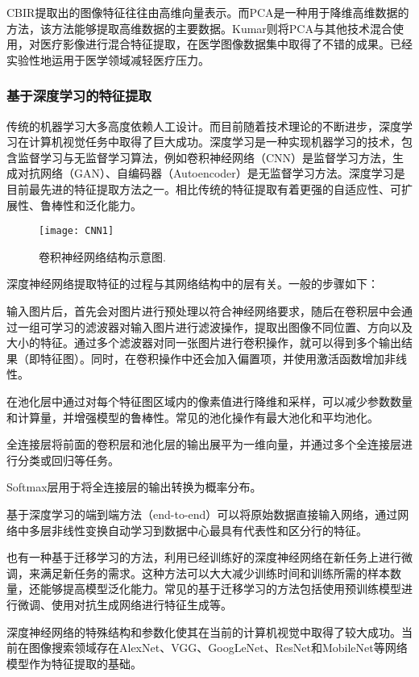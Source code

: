 \documentclass[bachelor_p]{hdu-thesis}
\begin{document}
CBIR提取出的图像特征往往由高维向量表示。而PCA是一种用于降维高维数据的方法，该方法能够提取高维数据的主要数据。Kumar\citep{KUMAR}则将PCA与其他技术混合使用，对医疗影像进行混合特征提取，在医学图像数据集中取得了不错的成果。已经实验性地运用于医学领域减轻医疗压力。

\subsubsection{基于深度学习的特征提取}

传统的机器学习大多高度依赖人工设计。而目前随着技术理论的不断进步，深度学习在计算机视觉任务中取得了巨大成功。深度学习是一种实现机器学习的技术，包含监督学习与无监督学习算法，例如卷积神经网络（CNN）是监督学习方法，生成对抗网络（GAN）、自编码器（Autoencoder）是无监督学习方法。深度学习是目前最先进的特征提取方法之一。相比传统的特征提取有着更强的自适应性、可扩展性、鲁棒性和泛化能力。

\begin{figure}[!htb]
  \centering
  \texttt{[image: CNN1]}
  \caption{卷积神经网络结构示意图.}
  \label{fig_CNN1}
\end{figure}


深度神经网络提取特征的过程与其网络结构中的层有关。一般的步骤如下：

输入图片后，首先会对图片进行预处理以符合神经网络要求，随后在卷积层中会通过一组可学习的滤波器对输入图片进行滤波操作，提取出图像不同位置、方向以及大小的特征。通过多个滤波器对同一张图片进行卷积操作，就可以得到多个输出结果（即特征图）。同时，在卷积操作中还会加入偏置项，并使用激活函数增加非线性。

在池化层中通过对每个特征图区域内的像素值进行降维和采样，可以减少参数数量和计算量，并增强模型的鲁棒性。常见的池化操作有最大池化和平均池化。

全连接层将前面的卷积层和池化层的输出展平为一维向量，并通过多个全连接层进行分类或回归等任务。

Softmax层用于将全连接层的输出转换为概率分布。

基于深度学习的端到端方法（end-to-end）可以将原始数据直接输入网络，通过网络中多层非线性变换自动学习到数据中心最具有代表性和区分行的特征。

也有一种基于迁移学习的方法，利用已经训练好的深度神经网络在新任务上进行微调，来满足新任务的需求。这种方法可以大大减少训练时间和训练所需的样本数量，还能够提高模型泛化能力。常见的基于迁移学习的方法包括使用预训练模型进行微调、使用对抗生成网络进行特征生成等。

深度神经网络的特殊结构和参数化使其在当前的计算机视觉中取得了较大成功。当前在图像搜索领域存在AlexNet、VGG、GoogLeNet、ResNet和MobileNet等网络模型作为特征提取的基础\citep{CBIRSHORT}。
\end{document}

